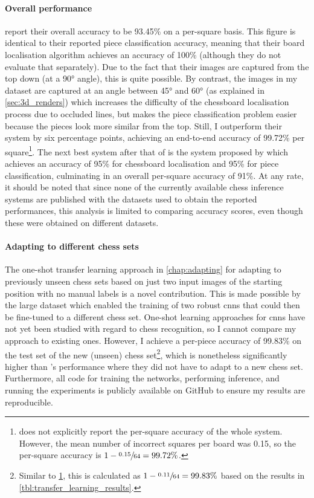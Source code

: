 \documentclass[../report.tex]{subfiles}
\begin{document}
\paragraph{Overall performance}
\Textcite{mehta2020} report their overall accuracy to be 93.45\% on a per-square basis.
This figure is identical to their reported piece classification accuracy, meaning that their board localisation algorithm achieves an accuracy of 100\% (although they do not evaluate that separately).
Due to the fact that their images are captured from the top down (at a 90° angle), this is quite possible.
By contrast, the images in my dataset are captured at an angle between 45° and 60° (as explained in \cref{sec:3d_renders}) which increases the difficulty of the chessboard localisation process due to occluded lines, but makes the piece classification problem easier because the pieces look more similar from the top.
Still, I outperform their system by six percentage points, achieving an end-to-end accuracy of 99.72\% per square\footnote{
    \label{ft:per_piece}
     does not explicitly report the per-square accuracy of the whole system.
    However, the mean number of incorrect squares per board was 0.15, so the per-square accuracy is $1-\sfrac{0.15}{64}=99.72\%$.
}.
The next best system after that of \citeauthor{mehta2020} is the system proposed by \textcite{czyzewski2020} which achieves an accuracy of 95\% for chessboard localisation and 95\% for piece classification, culminating in an overall per-square accuracy of 91\%.
At any rate, it should be noted that since none of the currently available chess inference systems are published with the datasets used to obtain the reported performances, this analysis is limited to comparing accuracy scores, even though these were obtained on different datasets.

\paragraph{Adapting to different chess sets}
The one-shot transfer learning approach in \cref{chap:adapting} for adapting to previously unseen chess sets based on just two input images of the starting position with no manual labels is a novel contribution.
This is made possible by the large dataset which enabled the training of two robust \glspl{cnn} that could then be fine-tuned to a different chess set.
One-shot learning approaches for \glspl{cnn} have not yet been studied with regard to chess recognition, so I cannot compare my approach to existing ones.
However, I achieve a per-piece accuracy of 99.83\% on the test set of the new (unseen) chess set\footnote{
    Similar to \cref{ft:per_piece}, this is calculated as $1-\sfrac{0.11}{64}=99.83\%$ based on the results in \cref{tbl:transfer_learning_results}.
}, which is nonetheless significantly higher than \citeauthor{mehta2020}'s performance where they did not have to adapt to a new chess set.
Furthermore, all code for training the networks, performing inference, and running the experiments is publicly available on GitHub to ensure my results are reproducible.

\ifSubfilesClassLoaded{%
\printglossary[type=\acronymtype]%
\printbibliography%
}{}%
\end{document}
